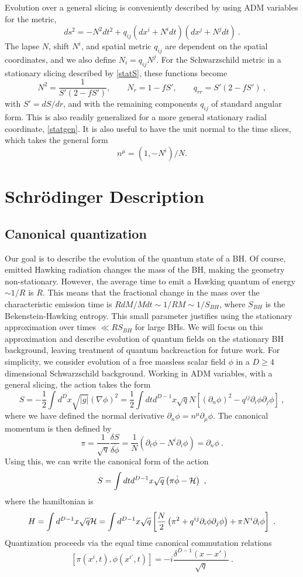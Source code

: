 \documentclass[11pt]{article}
\numberwithin{equation}{section}
\newcommand{\calh}{{\cal H}}
\newcommand{\beq}{\begin{equation}}
\newcommand{\eeq}{\end{equation}}
\newcommand{\hf}{\frac{1}{2}}
\begin{document}
Evolution over a general  slicing is conveniently described by using ADM variables\cite{ADM} for the metric,
\beq
\label{ADMmet}
ds^2 = -N^2 dt^2 +q_{ij}(dx^i + N^i dt)(dx^j + N^j dt)\ .
\eeq
The lapse $N$, shift $N^i$, and spatial metric $q_{ij}$ are dependent on the spatial coordinates, and we also define
$N_i =q_{ij} N^j$. For the Schwarzschild metric in a stationary slicing described by \eqref{statS}, these functions become\cite{NVU}
\beq\label{ADMvar}
N^2 = \frac{1}{S'(2-f S')},\quad \quad N_r = 1-f S',\quad\quad q_{rr} = S'(2-f S')\ ,
\eeq
with $S'=dS/dr$, and
with the remaining components $q_{ij}$ of standard angular form.  This is also readily generalized for a more general stationary radial coordinate, 
\eqref{statgen}.
It is also useful to have the unit normal to the time slices, which takes the general form 
\beq\label{normdef}
n^{\mu} = (1,-N^i)/N .
\eeq


\section{Schr\"odinger Description}
\label{Schsec}

\subsection{Canonical quantization}

Our goal is to describe the evolution of the quantum state of a BH.  
Of course, emitted Hawking radiation changes the mass of the BH, making the geometry non-stationary.  However, the average time to emit a Hawking quantum of energy $\sim 1/R$ is $R$.  This means that the fractional change in the mass over the characteristic emission time is $R dM/Mdt\sim 1/RM \sim 1/S_{BH}$, where $S_{BH}$ is the Bekenstein-Hawking entropy.  This small parameter justifies using the stationary approximation over times $\ll R S_{BH}$ for large BHs.  We will focus on this approximation and describe evolution of quantum fields on the stationary BH background, leaving treatment of quantum backreaction for future work.
For simplicity, we consider  evolution of a free massless scalar field $\phi$ in a $D\geq 4$ dimensional Schwarzschild background. Working in ADM variables, with a general slicing, the action takes the form 
\beq\label{Sact}
S=-\hf \int d^D x \sqrt{|g|} (\nabla\phi)^2 =  \frac{1}{2} \int dt d^{D-1}x \sqrt q N \left[ (\partial_n\phi)^2 - q^{ij}\partial_i \phi \partial_j \phi\right]\ ,
\eeq
where we have defined the normal derivative $\partial_n\phi=n^\mu\partial_\mu \phi$.  
The canonical momentum is then defined by
\beq\label{canonmom}
\pi= \frac{1}{\sqrt q}\frac{\delta S}{ \delta \dot\phi} = \frac{1}{N}\left(\partial_t \phi - N^i\partial_i\phi\right) = \partial_n\phi\ .
\eeq
Using this, we can write the canonical form of the action
\beq
S=\int dt d^{D-1}x \sqrt q \left(\pi \dot\phi  - \calh\right)\ ,
\eeq
where the hamiltonian is
\beq\label{ADMH}
H =  \int d^{D-1} x \sqrt q \calh= \int d^{D-1} x \sqrt q \left[ \frac{N}{2}\left(\pi^2+q^{ij}\partial_i\phi \partial_j\phi\right) + \pi N^i \partial_i\phi \right] \ .
\eeq 
Quantization proceeds via the equal time canonical commutation relations
\beq\label{CCRs}
[\pi(x^i, t), \phi(x^{i\prime}, t)]=-i \frac{\delta^{D-1}(x-x')}{\sqrt{q}}\ .
\eeq
\end{document}
